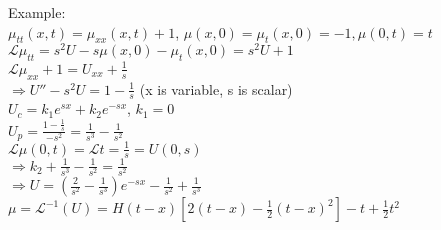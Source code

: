 \documentclass[10pt]{article}
\newcommand{\Lap}{\mathcal{L}}
\begin{document}
\begin{multicols}{2}
\begin{enumerate}
\begin{center}
		\end{center}
		Example:\\
		$\mu_{tt}(x,t) = \mu_{xx}(x,t) + 1$, $\mu(x,0) = \mu_t(x,0) = -1, \mu(0,t) = t$\\
		$\Lap{\mu_{tt}} = s^2U-s\mu(x,0) - \mu_t(x,0) = s^2U + 1$\\
		$\Lap{\mu_{xx} + 1} = U_{xx} + \frac{1}{s}$\\
		$\Rightarrow U'' - s^2U = 1 - \frac{1}{s}$ (x is variable, s is scalar)\\
		$U_c = k_1e^{sx} + k_2e^{-sx}$, $k_1 = 0$\\
		$U_p = \frac{1 - \frac{1}{s}}{-s^2} = \frac{1}{s^3} - \frac{1}{s^2}$\\
		$\Lap{\mu(0,t)} = \Lap{t} = \frac{1}{s} = U(0,s)$\\
		$\Rightarrow k_2 + \frac{1}{s^3} - \frac{1}{s^2} = \frac{1}{s^2}$\\
		$\Rightarrow U = (\frac{2}{s^2} - \frac{1}{s^3})e^{-sx} - \frac{1}{s^2} + \frac{1}{s^3}$\\
		$\mu = \Lap^{-1}(U) = H(t-x)[2(t-x)-\frac{1}{2}(t-x)^2] - t + \frac{1}{2}t^2$ 
		
	\end{enumerate}
\end{multicols}
\end{document}
